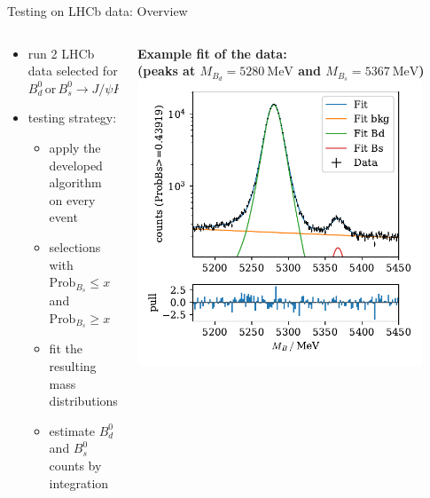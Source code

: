 \documentclass[aspectratio=1610, 10pt]{beamer}
\begin{document}
\begin{frame}{Testing on LHCb data: Overview}
  \begin{columns}
    \begin{column}{0.5\textwidth}
      \begin{itemize}
        \item run 2 LHCb data selected for $B^0_d \, \text{or} \, B^0_s \rightarrow J/\psi K^0_S$
        \item testing strategy:
        \begin{itemize}
          \item apply the developed algorithm on every event
          \item selections with $\text{Prob}_{B_s} \leq x$ and $\text{Prob}_{B_s} \geq x$
          \item fit the resulting mass distributions
          \item estimate $B^0_d$ and $B^0_s$ counts by integration
        \end{itemize}
      \end{itemize}
    \end{column}
    \pause
    \begin{column}{0.5\textwidth}
      \centering
      \textbf{Example fit of the data:\\(peaks at $M_{B_d} = \qty{5280}{\MeV}$ and $M_{B_s} = \qty{5367}{\MeV}$)}
      \includegraphics[width=0.9\textwidth]{images/fit_example.pdf}
    \end{column}
  \end{columns}  
\end{frame}
\end{document}
